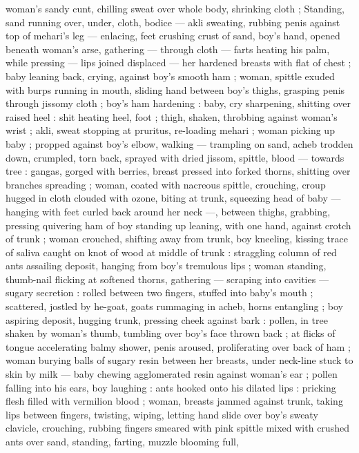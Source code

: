 woman's sandy cunt, chilling sweat over whole body, shrinking cloth 
; Standing, sand running over, under, cloth, bodice --- akli sweating, 
rubbing penis against top of mehari's leg --- enlacing, feet crushing 
crust of sand, boy's hand, opened beneath woman's arse, gathering 
--- through cloth --- farts heating his palm, while pressing --- lips 
joined displaced --- her hardened breasts with flat of chest ; baby 
leaning back, crying, against boy's smooth ham ; woman, spittle 
exuded with burps running in mouth, sliding hand between boy's 
thighs, grasping penis through jissomy cloth ; boy's ham hardening 
: baby, cry sharpening, shitting over raised heel : shit heating heel, 
foot ; thigh, shaken, throbbing against woman's wrist ; akli, sweat 
stopping at pruritus, re-loading mehari ; woman picking up baby ; 
propped against boy's elbow, walking --- trampling on sand, acheb 
trodden down, crumpled, torn back, sprayed with dried jissom, 
spittle, blood --- towards tree : gangas, gorged with berries, breast 
pressed into forked thorns, shitting over branches spreading ; 
woman, coated with nacreous spittle, crouching, croup hugged in 
cloth clouded with ozone, biting at trunk, squeezing head of baby --- 
hanging with feet curled back around her neck ---, between thighs, 
grabbing, pressing quivering ham of boy standing up leaning, with 
one hand, against crotch of trunk ; woman crouched, shifting away 
from trunk, boy kneeling, kissing trace of saliva caught on knot of 
wood at middle of trunk : straggling column of red ants assailing 
deposit, hanging from boy's tremulous lips ; woman standing, 
thumb-nail flicking at softened thorns, gathering --- scraping into 
cavities --- sugary secretion : rolled between two fingers, stuffed into 
baby's mouth ; scattered, jostled by he-goat, goats rummaging in 
acheb, horns entangling ; boy aspiring deposit, hugging trunk, 
pressing cheek against bark : pollen, in tree shaken by woman's 
thumb, tumbling over boy's face thrown back ; at flicks of tongue 
accelerating balmy shower, penis aroused, proliferating over back of 
ham ; woman burying balls of sugary resin between her breasts, 
under neck-line stuck to skin by milk --- baby chewing agglomerated 
resin against woman's ear ; pollen falling into his ears, boy laughing 
: ants hooked onto his dilated lips : pricking flesh filled with vermilion 
blood ; woman, breasts jammed against trunk, taking lips between 
fingers, twisting, wiping, letting hand slide over boy's sweaty clavicle, 
crouching, rubbing fingers smeared with pink spittle mixed with 
crushed ants over sand, standing, farting, muzzle blooming full, 
